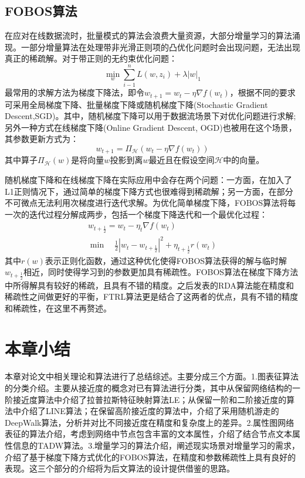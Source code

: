 \subsection{FOBOS算法}
在应对在线数据流时，批量模式的算法会浪费大量资源，大部分增量学习的算法涌现。一部分增量算法在处理带非光滑正则项的凸优化问题时会出现问题，无法出现真正的稀疏解。对于带正则的无约束优化问题：
\begin{equation}
	\min_w \sum_{i-1}^{n}L(w,z_i) +\lambda|w|_1
\end{equation}
最常用的求解方法为梯度下降法，即令$w_{t+1} = w_t - \eta 
\nabla f(w_t)$，根据不同的要求可采用全局梯度下降、批量梯度下降或随机梯度下降(Stochastic Gradient Descent,SGD)。其中，随机梯度下降可以用于数据流场景下对优化问题进行求解;另外一种方式在线梯度下降(Online Gradient Descent, OGD)\cite{zinkevich2003online}也被用在这个场景，其参数更新方式为：
\begin{equation}
	w_{t+1} = \Pi_{\mathcal{H}}(w_t - \eta 
	\nabla f(w_t))
\end{equation}
其中算子$\Pi_{\mathcal{H}}(w)$是将向量$w$投影到离$w$最近且在假设空间$\mathcal{H}$中的向量。

随机梯度下降和在线梯度下降在实际应用中会存在两个问题：一方面，在加入了L1正则情况下，通过简单的梯度下降方式也很难得到稀疏解；另一方面，在部分不可微点无法利用次梯度进行迭代求解。为优化简单梯度下降，FOBOS算法将每一次的迭代过程分解成两步，包括一个梯度下降迭代和一个最优化过程：
\begin{equation}
\begin{aligned}
w_{t+\frac{1}{2}} = w_t -\eta_t 
\nabla f(w_t) \\
\min \quad \frac{1}{2}|w_t-w_{t+\frac{1}{2}}|^2 + \eta_{t+\frac{1}{2}}r(w_t)
\end{aligned}
\end{equation}
其中$r(w)$表示正则化函数，通过这种优化使得FOBOS算法获得的解与临时解$w_{t+\frac{1}{2}}$相近，同时使得学习到的参数更加具有稀疏性。FOBOS算法在梯度下降方法中所得解具有较好的稀疏，且具有不错的精度。之后发表的RDA算法能在精度和稀疏性之间做更好的平衡，FTRL算法更是结合了这两者的优点，具有不错的精度和稀疏性，在这里不再赘述。





\section{本章小结}
本章对论文中相关理论和算法进行了总结综述。主要分成三个方面。1.图表征算法的分类介绍。主要从接近度的概念对已有算法进行分类，其中从保留网络结构的一阶接近度算法中介绍了拉普拉斯特征映射算法LE；从保留一阶和二阶接近度的算法中介绍了LINE算法；在保留高阶接近度的算法中，介绍了采用随机游走的DeepWalk算法，分析并对比不同接近度在精度和复杂度上的差异。2.属性图网络表征的算法介绍，考虑到网络中节点包含丰富的文本属性，介绍了结合节点文本属性信息的TADW算法。3.增量学习的算法介绍，阐述现实场景对增量学习的需求，介绍了基于梯度下降方式优化的FOBOS算法，在精度和参数稀疏性上具有良好的表现。这三个部分的介绍将为后文算法的设计提供借鉴的思路。





	